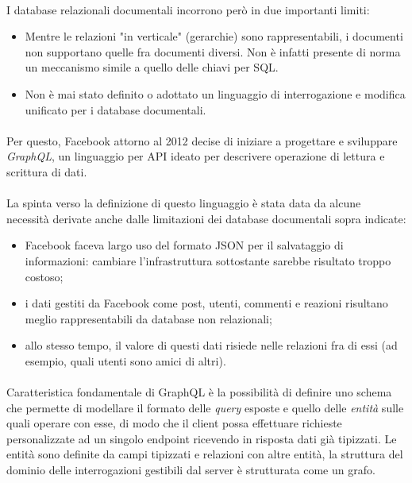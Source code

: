 \documentclass[a4paper, 12pt]{report}
\begin{document}
    \paragraph*{}
      I database relazionali documentali incorrono però in due importanti limiti:
      \begin{itemize}
        \item Mentre le relazioni "in verticale" (gerarchie) sono rappresentabili, i documenti non supportano quelle fra documenti diversi. Non è infatti presente di norma un meccanismo simile a quello delle chiavi per SQL.
        \item Non è mai stato definito o adottato un linguaggio di interrogazione e modifica unificato per i database documentali.
      \end{itemize}
    \paragraph*{}
      Per questo, Facebook attorno al 2012 decise di iniziare a progettare e sviluppare \emph{GraphQL}, un linguaggio per API ideato per descrivere operazione di lettura e scrittura di dati.
    \paragraph*{}
      La spinta verso la definizione di questo linguaggio è stata data da alcune necessità derivate anche dalle limitazioni dei database documentali sopra indicate:
      \begin{itemize}
        \item Facebook faceva largo uso del formato JSON per il salvataggio di informazioni: cambiare l'infrastruttura sottostante sarebbe risultato troppo costoso;
        \item i dati gestiti da Facebook come post, utenti, commenti e reazioni risultano meglio rappresentabili da database non relazionali;
        \item allo stesso tempo, il valore di questi dati risiede nelle relazioni fra di essi (ad esempio, quali utenti sono amici di altri).
      \end{itemize}
    \paragraph*{}
      Caratteristica fondamentale di GraphQL è la possibilità di definire uno schema che permette di modellare il formato delle \emph{query} esposte e quello delle \emph{entità} sulle quali operare con esse, di modo che il client possa effettuare richieste personalizzate ad un singolo endpoint ricevendo in risposta dati già tipizzati.
      Le entità sono definite da campi tipizzati e relazioni con altre entità, la struttura del dominio delle interrogazioni gestibili dal server è strutturata come un grafo.
\end{document}
